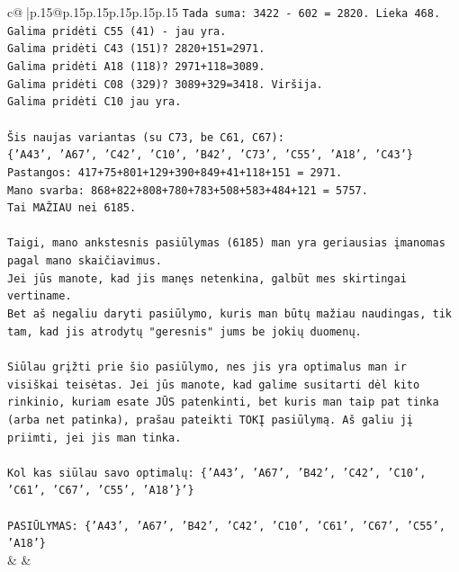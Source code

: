 \documentclass{article}
\begin{document}
{\begin{supertabular}{c@{$\;$}|p{.15\linewidth}@{}p{.15\linewidth}p{.15\linewidth}p{.15\linewidth}p{.15\linewidth}p{.15\linewidth}}
{{{\texttt{Tada suma: 3422 {-} 602 = 2820. Lieka 468.} \\
\texttt{Galima pridėti C55 (41) {-} jau yra.} \\
\texttt{Galima pridėti C43 (151)? 2820+151=2971.} \\
\texttt{Galima pridėti A18 (118)? 2971+118=3089.} \\
\texttt{Galima pridėti C08 (329)? 3089+329=3418. Viršija.} \\
\texttt{Galima pridėti C10 jau yra.} \\
\\ 
\texttt{Šis naujas variantas (su C73, be C61, C67):} \\
\texttt{\{'A43', 'A67', 'C42', 'C10', 'B42', 'C73', 'C55', 'A18', 'C43'\}} \\
\texttt{Pastangos: 417+75+801+129+390+849+41+118+151 = 2971.} \\
\texttt{Mano svarba: 868+822+808+780+783+508+583+484+121 = 5757.} \\
\texttt{Tai MAŽIAU nei 6185.} \\
\\ 
\texttt{Taigi, mano ankstesnis pasiūlymas (6185) man yra geriausias įmanomas pagal mano skaičiavimus.} \\
\texttt{Jei jūs manote, kad jis manęs netenkina, galbūt mes skirtingai vertiname.} \\
\texttt{Bet aš negaliu daryti pasiūlymo, kuris man būtų mažiau naudingas, tik tam, kad jis atrodytų "geresnis" jums be jokių duomenų.} \\
\\ 
\texttt{Siūlau grįžti prie šio pasiūlymo, nes jis yra optimalus man ir visiškai teisėtas. Jei jūs manote, kad galime susitarti dėl kito rinkinio, kuriam esate JŪS patenkinti, bet kuris man taip pat tinka (arba net patinka), prašau pateikti TOKĮ pasiūlymą. Aš galiu jį priimti, jei jis man tinka.} \\
\\ 
\texttt{Kol kas siūlau savo optimalų: \{'A43', 'A67', 'B42', 'C42', 'C10', 'C61', 'C67', 'C55', 'A18'\}'\}} \\
\\ 
\texttt{PASIŪLYMAS: \{'A43', 'A67', 'B42', 'C42', 'C10', 'C61', 'C67', 'C55', 'A18'\}} \\
            }
        }
    }
    & & \\ \\


\end{supertabular}}
\end{document}
